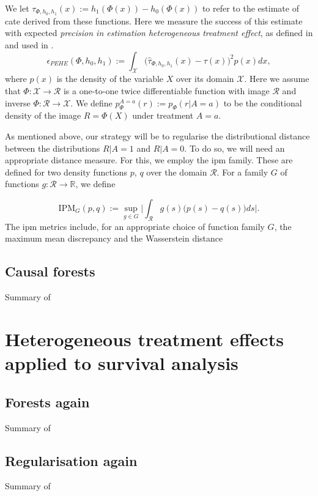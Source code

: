 \documentclass[../thesis.tex]{subfiles}
\begin{document}
We let $\tau_{\Phi, h_0, h_1}(x) := h_1(\Phi(x)) - h_0(\Phi(x))$ to refer to the estimate of \gls{cate} derived from these functions. Here we measure the success of this estimate with expected \emph{precision in estimation heterogeneous treatment effect}, as defined in \citet{hill_bayesian_2011} and used in \citet{shalit_estimating_2017}.
\[
\epsilon_{PEHE}(\Phi, h_0, h_1) :=  \int_{\mathcal{X}} \big(\hat{\tau}_{\Phi, h_0, h_1}(x) - \tau(x) \big)^2p(x) dx, 
\]
where $p(x)$ is the density of the variable $X$ over its domain $\mathcal{X}$. Here we assume that $\Phi \colon \mathcal{X} \rightarrow \mathcal{R}$ is a one-to-one twice differentiable function with image $\mathcal{R}$ and inverse $\Phi \colon \mathcal{R} \rightarrow \mathcal{X}$. We define $p_{\Phi}^{A=a}(r) := p_{\Phi}(r|A=a)$ to be the conditional density of the image $R = \Phi(X)$ under treatment $A=a$. 

As mentioned above, our strategy will be to regularise the distributional distance between the distributions $R | A = 1$ and $R | A =0$. To do so, we will need an appropriate distance measure. For this, we employ the \gls{ipm} family. These are defined for two density functions $p$, $q$ over the domain $\mathcal{R}$. For a family $G$ of functions $g \colon \mathcal{R} \rightarrow \mathbb{R}$, we define 

\[ \mathrm{IPM}_G(p,q) := \sup_{g \in G} \Big| \int_{\mathcal{R}} g(s)\big(p(s)-q(s)\big)ds\Big|.\]
The \gls{ipm} metrics include, for an appropriate choice of function family $G$, the maximum mean discrepancy and the Wasserstein distance \citep{}
\subsection{Causal forests}
{\color{red} Summary of \citet{athey_generalized_2019}}

\section{Heterogeneous treatment effects applied to survival analysis \label{sec:hte_survival}}

\subsection{Forests again \label{sec:surv_hte_forests}}
{\color{red} Summary of \citet{cui_estimating_2022}}

\subsection{Regularisation again}
{\color{red} Summary of \citet{chapfuwa_enabling_2021}}
\end{document}
